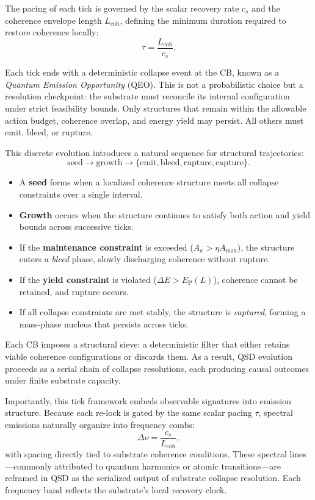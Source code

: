 \documentclass[preprints,article,submit,pdftex,moreauthors]{Definitions/mdpi}
\begin{document}
The pacing of each tick is governed by the scalar recovery rate \( c_s \) and the coherence envelope length \( L_{\mathrm{coh}} \), defining the minimum duration required to restore coherence locally:
\[
\tau = \frac{L_{\mathrm{coh}}}{c_s}.
\]

Each tick ends with a deterministic collapse event at the CB, known as a \emph{Quantum Emission Opportunity} (QEO). This is not a probabilistic choice but a resolution checkpoint: the substrate must reconcile its internal configuration under strict feasibility bounds. Only structures that remain within the allowable action budget, coherence overlap, and energy yield may persist. All others must emit, bleed, or rupture.

This discrete evolution introduces a natural sequence for structural trajectories:
\[
\text{seed} \rightarrow \text{growth} \rightarrow \{\text{emit}, \text{bleed}, \text{rupture}, \text{capture}\}.
\]
\begin{itemize}
    \item A \textbf{seed} forms when a localized coherence structure meets all collapse constraints over a single interval.
    \item \textbf{Growth} occurs when the structure continues to satisfy both action and yield bounds across successive ticks.
    \item If the \textbf{maintenance constraint} is exceeded (\( A_\kappa > \eta A_{\max} \)), the structure enters a \emph{bleed} phase, slowly discharging coherence without rupture.
    \item If the \textbf{yield constraint} is violated (\( \Delta E > E_{\mathrm{P}}(L) \)), coherence cannot be retained, and rupture occurs.
    \item If all collapse constraints are met stably, the structure is \emph{captured}, forming a mass-phase nucleus that persists across ticks.
\end{itemize}

Each CB imposes a structural sieve: a deterministic filter that either retains viable coherence configurations or discards them. As a result, QSD evolution proceeds as a serial chain of collapse resolutions, each producing causal outcomes under finite substrate capacity.

Importantly, this tick framework embeds observable signatures into emission structure. Because each re-lock is gated by the same scalar pacing \( \tau \), spectral emissions naturally organize into frequency combs:
\[
\Delta \nu = \frac{c_s}{L_{\mathrm{coh}}},
\]
with spacing directly tied to substrate coherence conditions. These spectral lines—commonly attributed to quantum harmonics or atomic transitions—are reframed in QSD as the serialized output of substrate collapse resolution. Each frequency band reflects the substrate’s local recovery clock.
\end{document}

